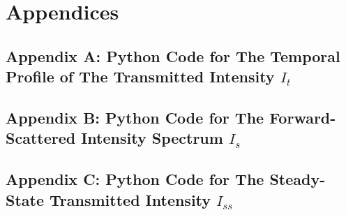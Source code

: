\chapter{Appendices}

\section{Appendix A: Python Code for The Temporal Profile of The Transmitted Intensity $I_{t}$}


\section{Appendix B: Python Code for The Forward-Scattered Intensity Spectrum $I_{s}$}


\section{Appendix C: Python Code for The Steady-State Transmitted Intensity $I_{ss}$}
